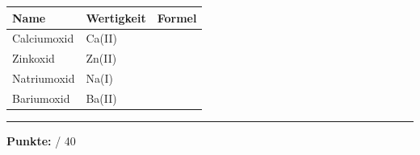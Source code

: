 \documentclass[10pt, a4paper]{article}
\newcommand{\maxpunkte}{40}
\newcommand{\luecke}[1]{\underline{\hspace{#1}}}
\begin{document}
\vspace{4pt}
\small
\begin{tabular}{|p{4cm}|p{2cm}|p{3cm}|}
\hline
\textbf{Name} & \textbf{Wertigkeit} & \textbf{Formel} \\
\hline
Calciumoxid & Ca(II) & \\[0.5em]
\hline
Zinkoxid & Zn(II) & \\[0.5em]
\hline
Natriumoxid & Na(I) & \\[0.5em]
\hline
Bariumoxid & Ba(II) & \\[0.5em]
\hline
\end{tabular}


\vfill
\hrule
\vspace{0.3em}

\hfill\textbf{Punkte:} \luecke{1cm} / \maxpunkte
\end{document}
